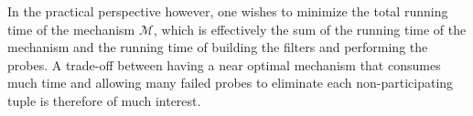 In the practical perspective however, one wishes to minimize the total running time of the mechanism $\mathcal{M}$, which is effectively the sum of the running time of the mechanism and the running time of building the filters and performing the probes. A trade-off between having a near optimal mechanism that consumes much time and allowing many failed probes to eliminate each non-participating tuple is therefore of much interest. 

